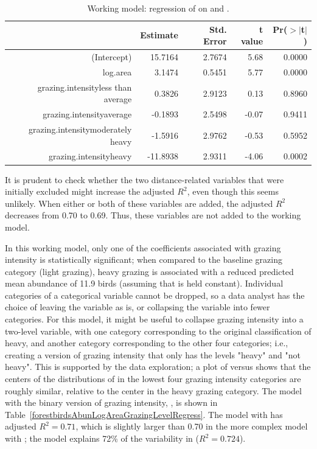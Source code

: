 \begin{table}[h]
	\centering
	\begin{tabular}{rrrrr}
		\hline
		& Estimate & Std. Error & t value & Pr($>$$|$t$|$) \\ 
		\hline
		(Intercept) & 15.7164 & 2.7674 & 5.68 & 0.0000 \\ 
		log.area & 3.1474 & 0.5451 & 5.77 & 0.0000 \\ 
		grazing.intensityless than average & 0.3826 & 2.9123 & 0.13 & 0.8960 \\ 
		grazing.intensityaverage & -0.1893 & 2.5498 & -0.07 & 0.9411 \\ 
		grazing.intensitymoderately heavy & -1.5916 & 2.9762 & -0.53 & 0.5952 \\ 
		grazing.intensityheavy & -11.8938 & 2.9311 & -4.06 & 0.0002 \\ 
		\hline
	\end{tabular}
	\caption{Working model: regression of  on  and .}
	\label{forestbirdsAbunLogAreaGrazingRegress}
\end{table}

It is prudent to check whether the two distance-related variables that were initially excluded might increase the adjusted $R^2$, even though this seems unlikely. When either or both of these variables are added, the adjusted $R^2$ decreases from 0.70 to 0.69. Thus, these variables are not added to the working model. 

In this working model, only one of the coefficients associated with grazing intensity is statistically significant; when compared to the baseline grazing category (light grazing), heavy grazing is associated with a reduced predicted mean abundance of 11.9 birds (assuming that  is held constant). Individual categories of a categorical variable cannot be dropped, so a data analyst has the choice of leaving the variable as is, or collapsing the variable into fewer categories. For this model, it might be useful to collapse grazing intensity into a two-level variable, with one category corresponding to the original classification of heavy, and another category corresponding to the other four categories; i.e., creating a version of grazing intensity that only has the levels "heavy" and "not heavy". This is supported by the data exploration; a plot of  versus  shows that the centers of the distributions of  in the lowest four grazing intensity categories are roughly similar, relative to the center in the heavy grazing category. The model with the binary version of grazing intensity, , is shown in Table~\ref{forestbirdsAbunLogAreaGrazingLevelRegress}. The model with  has adjusted $R^2 = 0.71$, which is slightly larger than 0.70 in the more complex model with ; the model explains 72\% of the variability in  ($R^2 = 0.724$). 

